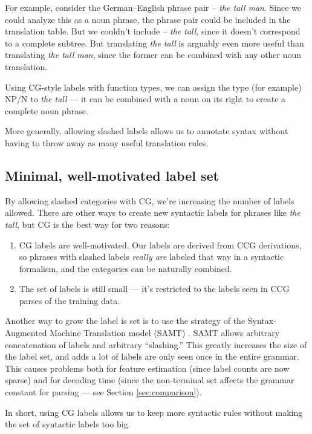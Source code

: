 \documentclass{article}
\begin{document}
For example, consider the German--English phrase pair {\em  -- the tall man}. Since we could analyze this as a noun phrase, the phrase pair could be included in the translation table. But we couldn't include {\em -- the tall}, since it doesn't correspond to a complete subtree. But translating {\em the tall} is arguably even more useful than translating {\em the tall man}, since the former can be combined with any other noun translation.

Using CG-style labels with function types, we can assign the type (for example) NP/N to {\em the tall} --- it can be combined with a noun on its right to create a complete noun phrase.

More generally, allowing slashed labels allows us to annotate syntax without having to throw away as many useful translation rules.

\subsection{Minimal, well-motivated label set}

By allowing slashed categories with CG, we're increasing the number of labels allowed. There are other ways to create new syntactic labels for phrases like {\em the tall}, but CG is the best way for two reasons:
\begin{enumerate}
\item CG labels are well-motivated. Our labels are derived from CCG derivations, so phrases with slashed labels {\em really are} labeled that way in a syntactic formalism, and the categories can be naturally combined.
\item The set of labels is still small --- it's restricted to the labels seen in CCG parses of the training data.
\end{enumerate}

Another way to grow the label is set is to use the strategy of the Syntax-Augmented Machine Translation model (SAMT) \cite{samt-wmt06}. SAMT allows arbitrary concatenation of labels and arbitrary ``slashing.'' This greatly increases the size of the label set, and adds a lot of labels are only seen once in the entire grammar. This causes problems both for feature estimation (since label counts are now sparse) and for decoding time (since the non-terminal set affects the grammar constant for parsing --- see Section \ref{sec:comparison}).

In short, using CG labels allows us to keep more syntactic rules without making the set of syntactic labels too big.
\end{document}
